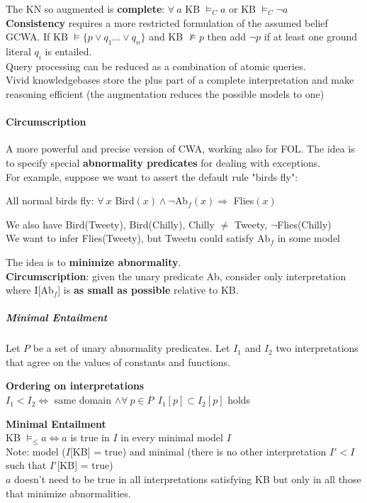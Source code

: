 \documentclass[10pt]{report}
\begin{document}
The KN so augmented is \textbf{complete}: $\forall\:a$ KB $\vDash_C a$ or KB $\vDash_C \neg a$\\
\textbf{Consistency} requires a more restricted formulation of the assumed belief GCWA. If KB $\vDash \{p\vee q_1\ldots\vee q_n\}$ and KB $\not\vDash p$ then add $\neg p$ if at least one ground literal $q_i$ is entailed.\\
Query processing can be reduced as a combination of atomic queries.\\
Vivid knowledgebases store the plus part of a complete interpretation and make reasoning efficient (the augmentation reduces the possible models to one)
\paragraph{Circumscription} A more powerful and precise version of CWA, working also for FOL. The idea is to specify special \textbf{abnormality predicates} for dealing with exceptions.\\
For example, suppose we want to assert the default rule "birds fly":
\begin{list}{}{}
	\item All normal birds fly: $\forall\:x$ Bird$(x) \wedge\neg$Ab$_f(x)\Rightarrow$ Flies$(x)$
	\item We also have Bird(Tweety), Bird(Chilly), Chilly $\neq$ Tweety, $\neg$Flies(Chilly)\\
	We want to infer Flies(Tweety), but Tweetu could satisfy Ab$_f$ in some model
\end{list}
The idea is to \textbf{minimize abnormality}.\\
\textbf{Circumscription}: given the unary predicate Ab, consider only interpretation where I[Ab$_f$] is \textbf{as small as possible} relative to KB.
\subparagraph{Minimal Entailment} Let $P$ be a set of unary abnormality predicates. Let $I_1$ and $I_2$ two interpretations that agree on the values of constants and functions.\begin{list}{}{}
	\item \textbf{Ordering on interpretations}\\
	$I_1 < I_2 \Leftrightarrow$ same domain $\wedge\forall\:p\in P\:\:I_1[p]\subset I_2[p]$ holds
	\item \textbf{Minimal Entailment}\\
	KB $\vDash_\leq a \Leftrightarrow a$ is true in $I$ in every minimal model $I$\\
	Note: model ($I$[KB] = true) and minimal (there is no other interpretation $I' < I$ such that $I'$[KB] = true)\\
	$a$ doesn't need to be true in all interpretations satisfying KB but only in all those that minimize abnormalities.
\end{list}
\end{document}
